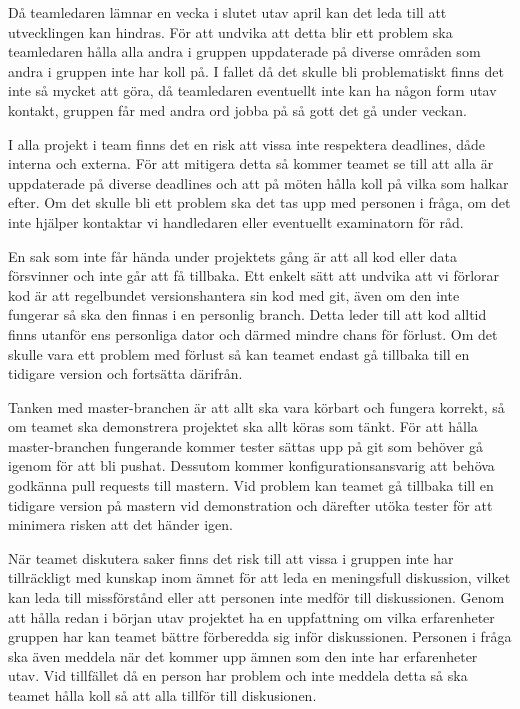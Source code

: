 {
    Då teamledaren lämnar en vecka i slutet utav april kan det leda till att utvecklingen kan
    hindras. För att undvika att detta blir ett problem ska teamledaren hålla alla andra i
    gruppen uppdaterade på diverse områden som andra i gruppen inte har koll på. I fallet då det skulle bli
    problematiskt finns det inte så mycket att göra, då teamledaren eventuellt inte kan ha någon form utav kontakt,
    gruppen får med andra ord jobba på så gott det gå under veckan.
}

{
   I alla projekt i team finns det en risk att vissa inte respektera deadlines, dåde interna och
   externa. För att mitigera detta så kommer teamet se till att alla är uppdaterade på
   diverse deadlines och att på möten hålla koll på vilka som halkar efter. Om det skulle bli
   ett problem ska det tas upp med personen i fråga, om det inte hjälper kontaktar vi handledaren
   eller eventuellt examinatorn för råd.
}

{
    En sak som inte får hända under projektets gång är att all kod eller data försvinner och 
    inte går att få tillbaka. Ett enkelt sätt att undvika att vi förlorar kod är att regelbundet
    versionshantera sin kod med git, även om den inte fungerar så ska den finnas i en personlig
    branch. Detta leder till att kod alltid finns utanför ens personliga dator och därmed mindre
    chans för förlust. Om det skulle vara ett problem med förlust så kan teamet endast gå 
    tillbaka till en tidigare version och fortsätta därifrån.
}

{
    Tanken med master-branchen är att allt ska vara körbart och fungera korrekt, så om teamet ska
    demonstrera projektet ska allt köras som tänkt. För att hålla master-branchen fungerande
    kommer tester sättas upp på git som behöver gå igenom för att bli pushat. Dessutom kommer
    konfigurationsansvarig att behöva godkänna pull requests till mastern. Vid problem kan teamet
    gå tillbaka till en tidigare version på mastern vid demonstration och därefter utöka tester
    för att minimera risken att det händer igen.
}

{
   När teamet diskutera saker finns det risk till att vissa i gruppen inte har tillräckligt med
   kunskap inom ämnet för att leda en meningsfull diskussion, vilket kan leda till missförstånd
   eller att personen inte medför till diskussionen. Genom att hålla redan i början utav
   projektet ha en uppfattning om vilka erfarenheter gruppen har kan teamet bättre förberedda sig
   inför diskussionen. Personen i fråga ska även meddela när det kommer upp ämnen som den inte
   har erfarenheter utav. Vid tillfället då en person har problem och inte meddela detta så
   ska teamet hålla koll så att alla tillför till diskusionen.
}

\pagebreak

